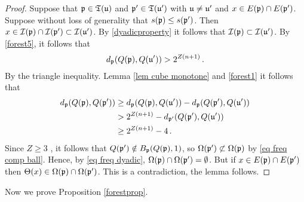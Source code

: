 \begin{proof}
    Suppose that $\mathfrak p \in \mathfrak T(\mathfrak u)$ and $\mathfrak p' \in \mathfrak T(\mathfrak u')$ with $\mathfrak u \ne \mathfrak u'$ and $x \in E(\mathfrak p) \cap E(\mathfrak p')$. Suppose without loss of generality that $s(\mathfrak p) \le s(\mathfrak p')$. Then $x \in \mathcal{I}(\mathfrak p) \cap \mathcal{I}(\mathfrak p') \subset \mathcal{I}(\mathfrak u')$. By \eqref{dyadicproperty} it follows that $\mathcal{I}(\mathfrak p) \subset \mathcal{I}(\mathfrak u')$. By \eqref{forest5}, it follows that
    $$
        d_{\mathfrak p}(Q(\mathfrak p), Q(\mathfrak u')) > 2^{Z(n+1)}\,.
    $$
    By the triangle inequality. Lemma \ref{lem cube monotone} and \eqref{forest1} it follows that
    \begin{align*}
        d_{\mathfrak p}(Q(\mathfrak p), Q(\mathfrak p')) &\ge d_{\mathfrak p}(Q(\mathfrak p), Q(\mathfrak u')) - d_{\mathfrak p}(Q(\mathfrak p'), Q(\mathfrak u'))\\
        &> 2^{Z(n+1)} - d_{\mathfrak p'}(Q(\mathfrak p'), Q(\mathfrak u'))\\
        &\ge 2^{Z(n+1)} - 4\,.
    \end{align*}
    Since $Z \ge 3$ , it follows that $Q(\mathfrak p') \notin B_{\mathfrak p}(Q(\mathfrak p), 1)$, so $\Omega(\mathfrak p') \not\subset \Omega(\mathfrak p)$ by \eqref{eq freq comp ball}. Hence, by \eqref{eq freq dyadic}, $\Omega(\mathfrak p) \cap \Omega(\mathfrak p') = \emptyset$. But if $x \in E(\mathfrak p) \cap E(\mathfrak p')$ then $\Theta(x) \in \Omega(\mathfrak p) \cap \Omega(\mathfrak p')$. This is a contradiction, the lemma follows.
\end{proof}

Now we prove Proposition \ref{forestprop}.

